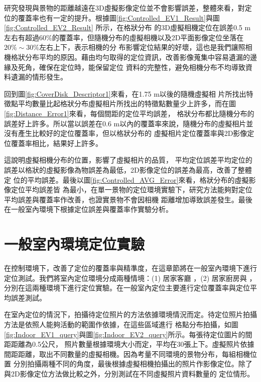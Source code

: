 	研究發現與景物的距離越遠在3D虛擬影像定位並不會影響誤差，整體來看，對定位的覆蓋率也有一定的提升。根據圖\ref{fig:Controlled_EV1_Result}與圖\ref{fig:Controlled_EV2_Result}
所示，在格狀分布
的3D虛擬相機定位在誤差0.5 m左右有超過$60\%$的覆蓋率，但隨機分布的虛擬相機以及2D平面影像定位坐落在$20\% \sim 30\%$左右上下，表示相機的分
布影響定位結果的好壞，這也是我們讓照相機格狀分布平均的原因。藉由均勻取得的定位資訊，改善影像蒐集中容易遺漏的邊緣及死角，確保在定位時，能保留定位
資料的完整性，避免相機分布不均導致資料遺漏的情形發生。

回到圖\ref{fig:CoverDisk_Descriptor1}來看，在1.75 m以後的隨機虛擬相
片所找出特徵點平均數量比起格狀分布虛擬相片所找出的特徵點數量少上許多，而在圖\ref{fig:Distance_Error1}來看，每個間距的定位平均誤差，
格狀分布都比隨機分布的誤差好上許多。所以當以誤差在0.6 m以內的覆蓋率來說，隨機分布的虛擬相片並沒有產生比較好的定位覆蓋率，但以格狀分布的
虛擬相片定位覆蓋率與2D影像定位覆蓋率相比，結果好上許多。

這說明虛擬相機分布的位置，影響了虛擬相片的品質，
平均定位誤差平均定位的誤差以格狀的虛擬影像為物誤差為最低，2D影像定位的誤差為最高，改善了整體定
位的平均誤差。最後以圖\ref{fig:Controlled_AVG_Error}來看，格狀分布的虛擬影像定位平均誤差皆
為最小，在單一景物的定位環境實驗下，研究方法能夠對定位平均誤差與覆蓋率作改善，也證實景物不會因相機
距離增加導致誤差發生。最後在一般室內環境下根據定位誤差與覆蓋率作實驗分析。

\section{一般室內環境定位實驗}

	在控制環境下，改善了定位的覆蓋率與精準度，在這章節將在一般室內環境下進行定位測試。我們將室內定位環境分成兩種情境：(1)
居家客廳 ，(2) 居家廚房與 ，分別在這兩種環境下進行定位實驗。在一般室內定位主要進行定位覆蓋率與定位平均誤差測試。
	
	在室內定位的情況下，拍攝待定位照片的方法依據環境情況而定。待定位照片拍攝方法是依照人能夠活動的範圍作依據，在這些區域進行
格點分布拍攝，如圖\ref{fig:Indoor_EV1_query}與圖\ref{fig:Indoor_EV2_query}所示。每張待定位圖片的間距距離為0.5公尺，
照片數量根據環境大小而定，平均在30張上下。虛擬照片依據間距距離，取出不同數量的虛擬相機。因為考量不同環境的景物分布，每組相機位置
分別拍攝兩種不同的角度，最後根據虛擬相機拍攝出的照片作影像定位。除了與2D影像定位方法做比較之外，分別測試在不同虛擬照片資料數量的
定位情形。
		
	
	
